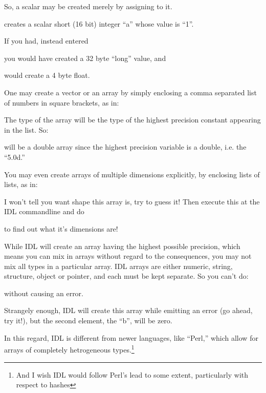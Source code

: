 \documentclass{article}
\begin{document}
  So, a scalar may be created merely by assigning to it.


  creates a scalar short (16 bit) integer ``a'' whose value is ``1''.

  If you had, instead entered


  you would have created a 32 byte ``long'' value, and 


  would create a 4 byte float.
 
  One may create a vector or an array by simply enclosing a comma
  separated list of numbers in square brackets, as in:

  

  The type of the array will be the type of the highest precision
  constant appearing in the list. So:


   will be a double array since the highest precision variable is a
   double, i.e. the ``5.0d.''

  You may even create arrays of multiple dimensions explicitly, by
   enclosing lists of lists, as in:

 
  I won't tell you want shape this array is, try to guess it! Then
   execute this at the IDL commandline and do


  to find out what it's dimensions are!


  While IDL will create an array having the highest possible
  precision, which means you can mix  in arrays 
  without regard to the consequences, you may not mix all types in a
  particular array. IDL arrays are either numeric, string, structure,
  object or pointer, and each must be kept separate. So you can't do:
 


  without causing an error. 

  Strangely enough, IDL will create this array while emitting an error
  (go ahead, try it!), but the second element, the ``b'', will be zero.

  In this regard, IDL is different from newer languages, like ``Perl,''
  which allow for arrays of completely hetrogeneous
  types.\footnote{And I wish IDL would follow Perl's lead to some
  extent, particularly with respect to hashes}
\end{document}
